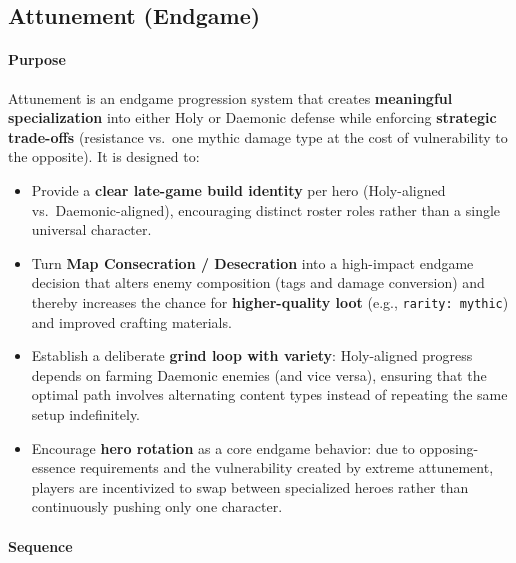 \vspace{1em}

\subsection{Attunement (Endgame)}

\paragraph{Purpose}

Attunement is an endgame progression system that creates \textbf{meaningful specialization} into either Holy or Daemonic defense while enforcing \textbf{strategic trade-offs} (resistance vs.\ one mythic damage type at the cost of vulnerability to the opposite).
It is designed to:

\begin{itemize}
	\item Provide a \textbf{clear late-game build identity} per hero (Holy-aligned vs.\ Daemonic-aligned), encouraging distinct roster roles rather than a single universal character.
	\item Turn \textbf{Map Consecration / Desecration} into a high-impact endgame decision that alters enemy composition (tags and damage conversion) and thereby increases the chance for \textbf{higher-quality loot} (e.g., \texttt{rarity: mythic}) and improved crafting materials.
	\item Establish a deliberate \textbf{grind loop with variety}: Holy-aligned progress depends on farming Daemonic enemies (and vice versa), ensuring that the optimal path involves alternating content types instead of repeating the same setup indefinitely.
	\item Encourage \textbf{hero rotation} as a core endgame behavior: due to opposing-essence requirements and the vulnerability created by extreme attunement, players are incentivized to swap between specialized heroes rather than continuously pushing only one character.
\end{itemize}

\paragraph{Sequence}

